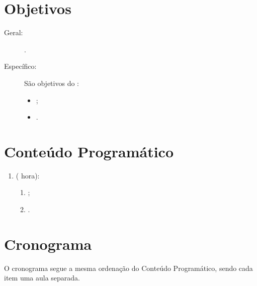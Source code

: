 \documentclass{article}
\begin{document}
\section{Objetivos}

\begin{description}
    \item[Geral:] .
    \item[Específico:] São objetivos do :
        \begin{itemize}[label={-}]
                \item[] ;
                \item[] .
        \end{itemize}
\end{description}

\section{Conteúdo Programático}

\begin{enumerate}
    \item {} ( hora):
        \begin{enumerate}
                \item {};
                \item {}.
        \end{enumerate}
\end{enumerate}

\section{Cronograma}

O cronograma segue a mesma ordenação do Conteúdo Programático, sendo cada item
uma aula separada.

\nocite{*}


\end{document}
